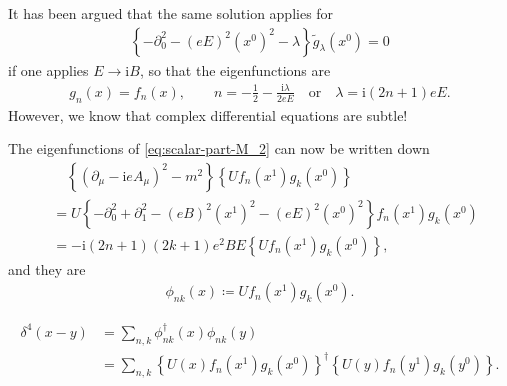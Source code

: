 \documentclass[12pt]{article}
\newcommand\mi{\mathrm{i}} %
\newcommand\me{\mathrm{e}} %
\newcommand\dif{\mathrm{d}}
\DeclareMathOperator{\Tr}{Tr}
\newcommand{\rbr}[1]{{\left(#1\right)}}
\newcommand{\cbr}[1]{{\left\{#1\right\}}}
\newcommand{\rfun}[2]{{#1}\mathopen{}\left(#2\right)\mathclose{}}
\newcommand{\sfun}[2]{{#1}\mathopen{}\left[#2\right]\mathclose{}}
\begin{document}
It has been argued that the same solution applies for
\begin{align}
\cbr{-\partial_0^2 - \rbr{eE}^2 \rbr{x^0}^2 - \lambda}
\rfun{\tilde{g}_\lambda}{x^0} = 0
\end{align}
if one applies $E\to\mi B$, so that the eigenfunctions are
\begin{align}
\rfun{g_n}{x} = \rfun{f_n}{x},\qquad n = -\frac{1}{2}-\frac{\mi \lambda}{2eE}
\quad\text{or}\quad \lambda = \mi\rbr{2n+1}eE.
\end{align}
However, we know that complex differential equations are subtle!

The eigenfunctions of \cref{eq:scalar-part-M_2} can now be written down
\begin{align}
&\quad\cbr{\rbr{\partial_\mu - \mi e A_\mu}^2 - m^2}
\cbr{U\rfun{f_n}{x^1}\rfun{g_k}{x^0}} \nonumber \\
&= U \cbr{-\partial_0^2 + \partial_1^2 - \rbr{eB}^2 \rbr{x^1}^2 -
\rbr{eE}^2 \rbr{x^0}^2} \rfun{f_n}{x^1} \rfun{g_k}{x^0} \nonumber \\
&= -\mi\rbr{2n+1}\rbr{2k+1}e^2BE \cbr{U \rfun{f_n}{x^1} \rfun{g_k}{x^0}},
\end{align}
and they are
\begin{align}
\rfun{\phi_{nk}}{x} \coloneqq U\rfun{f_n}{x^1}\rfun{g_k}{x^0}.
\end{align}

\begin{align}
\rfun{\delta^4}{x-y} &=
\sum_{n,k} \rfun{\phi_{nk}^\dagger}{x} \rfun{\phi_{nk}}{y} \nonumber \\
&= \sum_{n,k}
\cbr{\rfun{U}{x}\rfun{f_n}{x^1}\rfun{g_k}{x^0}}^\dagger 
\cbr{\rfun{U}{y}\rfun{f_n}{y^1}\rfun{g_k}{y^0}}.
\end{align}







\cite{heisenberg1936}

\end{document}
